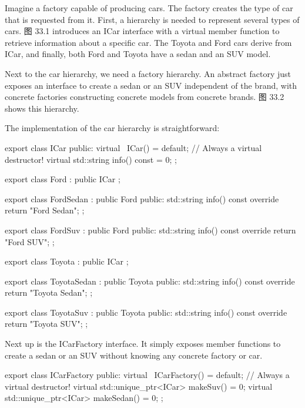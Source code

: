 
Imagine a factory capable of producing cars. The factory creates the type of car that is requested from it. First, a hierarchy is needed to represent several types of cars. 图 33.1 introduces an ICar interface with a virtual member function to retrieve information about a specific car. The Toyota and Ford cars derive from ICar, and finally, both Ford and Toyota have a sedan and an SUV model.

Next to the car hierarchy, we need a factory hierarchy. An abstract factory just exposes an interface to create a sedan or an SUV independent of the brand, with concrete factories constructing concrete models from concrete brands. 图 33.2 shows this hierarchy.




The implementation of the car hierarchy is straightforward:

\begin{cpp}
export class ICar
{
    public:
    virtual ~ICar() = default; // Always a virtual destructor!
    virtual std::string info() const = 0;
};

export class Ford : public ICar { };

export class FordSedan : public Ford
{
    public:
    std::string info() const override { return "Ford Sedan"; }
};

export class FordSuv : public Ford
{
    public:
    std::string info() const override { return "Ford SUV"; }
};

export class Toyota : public ICar { };

export class ToyotaSedan : public Toyota
{
    public:
    std::string info() const override { return "Toyota Sedan"; }
};

export class ToyotaSuv : public Toyota
{
    public:
    std::string info() const override { return "Toyota SUV"; }
};
\end{cpp}

Next up is the ICarFactory interface. It simply exposes member functions to create a sedan or an SUV without knowing any concrete factory or car.

\begin{cpp}
export class ICarFactory
{
    public:
        virtual ~ICarFactory() = default; // Always a virtual destructor!
        virtual std::unique_ptr<ICar> makeSuv() = 0;
        virtual std::unique_ptr<ICar> makeSedan() = 0;
};
\end{cpp}

